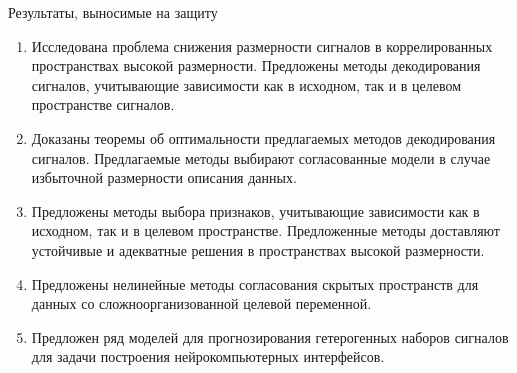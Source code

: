 \documentclass[10pt]{beamer}
\begin{document}
\begin{frame}{Результаты, выносимые на защиту}
\begin{enumerate}
	\item Исследована проблема снижения размерности сигналов в коррелированных пространствах высокой размерности. 
	Предложены методы декодирования сигналов, учитывающие зависимости как в исходном, так и в целевом пространстве сигналов.
	\vfill
	\item Доказаны теоремы об оптимальности предлагаемых методов декодирования сигналов. Предлагаемые методы выбирают согласованные модели в случае избыточной размерности описания данных.
	\vfill 
	\item Предложены методы выбора признаков, учитывающие зависимости как в исходном, так и в целевом пространстве. Предложенные методы доставляют устойчивые и адекватные решения в пространствах высокой размерности.
	\vfill
	\item Предложены нелинейные методы согласования скрытых пространств для данных со сложноорганизованной целевой переменной.
	\vfill
	\item Предложен ряд моделей для прогнозирования гетерогенных наборов сигналов для задачи построения нейрокомпьютерных интерфейсов.
\end{enumerate}
\end{frame}
\end{document}

